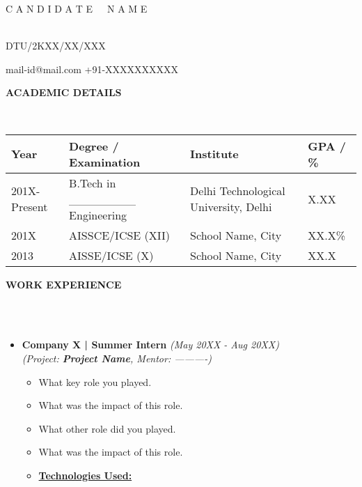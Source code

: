 \documentclass[a4paper,10pt]{article}
\newcommand{\isep}{-2 pt}
\newcommand{\lsep}{-0.5cm}
\newcommand{\resheading}[1]
{{
	\small \colorbox{mygrey}
	{\begin{minipage}
		{1.0\textwidth}
		{\textbf{#1 \vphantom{p\^{E}}}}
	\end{minipage}}
}}
\begin{document}
	\begin{center}
		\begin{Large}
			{C A N D I D A T E\ \ \ N A M E} 
		\end{Large} 
		\\
		DTU/2KXX/XX/XXX
	\end{center}
	\indent \hspace{10pt} mail-id@mail.com \hspace{300pt} +91-XXXXXXXXXX 
	\\[-0.3cm]

	\resheading{\textbf{ACADEMIC DETAILS} }
	\\[\lsep]

	\begin{center}
		\indent 
		\begin{tabular}
			{ l @{\hskip 0.15in} l @{\hskip 0.25in} l @{\hskip 0.25in}  l }
			\hline
			\textbf{Year} & \textbf{Degree / Examination} & \textbf{Institute} & \textbf{GPA / \%} \\
			\hline
			201X-Present & B.Tech in \_\_\_\_\_\_\_\_ Engineering & 
			Delhi Technological University, Delhi & X.XX\\
			201X & AISSCE/ICSE (XII) & 
			School Name, City & XX.X\% \\
			2013 & AISSE/ICSE (X) & 
			School Name, City & XX.X\\
			\hline
		\end{tabular}
	\end{center}

	\resheading{\textbf{WORK EXPERIENCE} }\\[\lsep]
	\\[-0.25cm]
	\begin{itemize}
		\item \textbf{Company X |  Summer Intern} \hspace{235pt} \emph{(May 20XX - Aug 20XX)}
 		\\ [0.1cm]
 		\emph{(Project: \textbf{Project Name}, Mentor: ----------)} \\[-0.6cm]
    		\begin{itemize}\itemsep \isep
				\item What key role you played.
   				\item What was the impact of this role. 
    			\item What other role did you played.
    			\item What was the impact of this role.
    			\item \underline{\textbf{Technologies Used:}} 
    		\end{itemize}
	\end{itemize}
\end{document}
